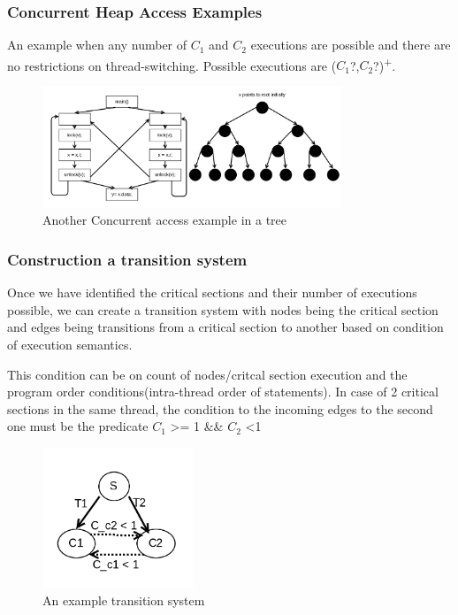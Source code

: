 \documentclass{beamer}
\begin{document}
\begin{frame}
	\frametitle{Concurrent Heap Access Examples}
	An example when any number of $C_1$ and $C_2$ executions are possible and there are no restrictions on thread-switching. Possible executions are ($C_1$?,$C_2$?)\textsuperscript{+}.
	\begin{figure}
		\centering
		\includegraphics[width=0.8\textwidth]{Figures/tree4.png}
		\caption{Another Concurrent access example in a tree}
		\label{fig:ch5example}
			
	\end{figure}
\end{frame}

\begin{frame}
	\frametitle{Construction a transition system}
	Once we have identified the critical sections and their number of executions possible, we can create a transition system with nodes being the critical section and edges being transitions from a critical section to another based on condition of execution semantics.
	
	\vspace{\baselineskip}
	
	This condition can be on count of nodes/critcal section execution and the program order conditions(intra-thread order of statements). In case of 2 critical sections in the same thread, the condition to the incoming edges to the second one must be the predicate $C_1$ \textgreater= 1 \&\& $C_2$ \textless 1
	
	\begin{figure}
		\centering
		\includegraphics[width=0.4\textwidth]{Figures/automata_rep.png}
		\caption{An example transition system}
		\label{fig:ch5example}
	\end{figure}
	
\end{frame}
\end{document}
